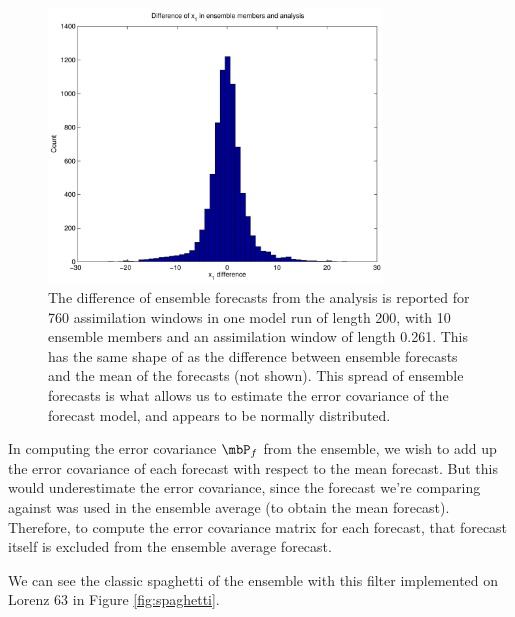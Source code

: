 \begin{figure}[h!]
  \centering
  \includegraphics[width=0.79\textwidth]{figures/EnKF-histogram-analysis.pdf}
  \caption[The difference of ensemble forecasts from the analysis is reported for 760 assimilation windows in one model run of length 200, with 10 ensemble members and an assimilation window of length 0.261]{
    The difference of ensemble forecasts from the analysis is reported for 760 assimilation windows in one model run of length 200, with 10 ensemble members and an assimilation window of length 0.261.
    This has the same shape of as the difference between ensemble forecasts and the mean of the forecasts (not shown).
    This spread of ensemble forecasts is what allows us to estimate the error covariance of the forecast model, and appears to be normally distributed.
  }
  \label{fig:EnKFhist}
\end{figure}

In computing the error covariance $\mbP_f$ from the ensemble, we wish to add up the error covariance of each forecast with respect to the mean forecast. 
But this would underestimate the error covariance, since the forecast we're comparing against was used in the ensemble average (to obtain the mean forecast).
Therefore, to compute the error covariance matrix for each forecast, that forecast itself is excluded from the ensemble average forecast.

We can see the classic spaghetti of the ensemble with this filter implemented on Lorenz 63 in Figure \ref{fig:spaghetti}.

